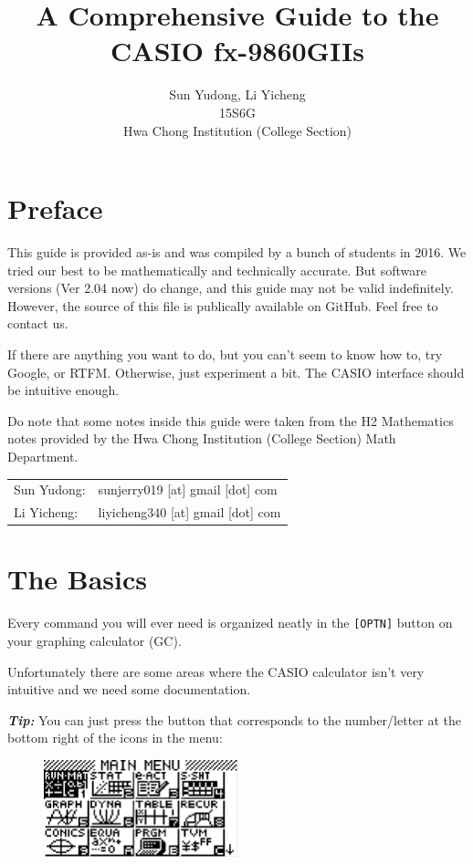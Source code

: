 \documentclass[a5paper,draft]{memoir}
\title{A Comprehensive Guide to the CASIO fx-9860GIIs}
\author{Sun Yudong, Li Yicheng \\ 15S6G \\ Hwa Chong Institution (College Section)}
\def\code#1{\texttt{#1}}
\def\tip#1{\textbf{\textit{Tip:}} #1}
\begin{document}
\begin{titlingpage}
	\maketitle
\end{titlingpage}

\frontmatter

\tableofcontents

\chapter{Preface}
This guide is provided as-is and was compiled by a bunch of students in 2016. We tried our best to be mathematically and technically accurate. But software versions (Ver 2.04 now) do change, and this guide may not be valid indefinitely. However, the source of this file is publically available on GitHub. Feel free to contact us.

If there are anything you want to do, but you can't seem to know how to, try Google, or RTFM. Otherwise, just experiment a bit. The CASIO interface should be intuitive enough.

Do note that some notes inside this guide were taken from the H2 Mathematics notes provided by the Hwa Chong Institution (College Section) Math Department. 

\vspace{0.7cm}

\begin{tabular}{l l}
	Sun Yudong: & sunjerry019 [at] gmail [dot] com \\
	Li Yicheng: & liyicheng340 [at] gmail [dot] com 
\end{tabular}


\mainmatter
\chapter{The Basics}
Every command you will ever need is organized neatly in the \code{[OPTN]} button on your graphing calculator (GC).

Unfortunately there are some areas where the CASIO calculator isn't very intuitive and we need some documentation.

\tip{You can just press the button that corresponds to the number/letter at the bottom right of the icons in the menu:}

\begin{figure}[h]
	\centering
	\includegraphics[width=0.5\textwidth]{mainmenu}
\end{figure}
\end{document}
